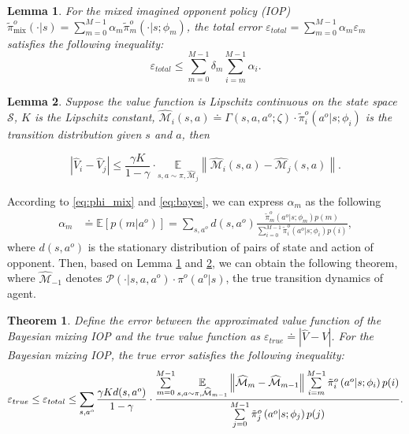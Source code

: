 \documentclass{article}
\newtheorem{theorem}{Theorem}
\newtheorem{lemma}{Lemma}
\begin{document}
\begin{lemma}
For the mixed imagined opponent policy (IOP) $\tilde{\pi}_{\operatorname{mix}}^o(\cdot|s) = \sum_{m=0}^{M-1}\alpha_m\tilde{\pi}^o_m(\cdot|s; \phi_m)$, the total error $\varepsilon_{total} = \sum_{m=0}^{M-1}\alpha_m\varepsilon_m$ satisfies the following inequality:
\begin{equation*}\label{eq:total-bound}
    \varepsilon_{total}\leq\sum_{m=0}^{M-1}\delta_m\sum_{i=m}^{M-1}\alpha_i.
\end{equation*}
\label{lem:total-error}
\end{lemma}


\begin{lemma}
Suppose the value function is Lipschitz continuous on the state space $\mathcal{S}$, $K$ is the Lipschitz constant, $\widehat{\mathcal{M}}_i(s,a) \doteq \Gamma(s,a,a^o;\zeta) \cdot \tilde{\pi}^o_i(a^o|s;\phi_i)$ is the transition distribution given $s$ and $a$, then

\begin{equation*}
\left|\widehat{V}_i-\widehat{V}_{j}\right| \leq\frac{\gamma K}{1-\gamma} \cdot\underset{s,a\sim \pi,\widehat{\mathcal{M}}_j}{\mathbb{E}}\left\|\widehat{\mathcal{M}}_i(s, a)-\widehat{\mathcal{M}}_j(s, a)\right\|.
\end{equation*}
\label{lem:obj-bound}
\end{lemma}
According to \eqref{eq:phi_mix} and \eqref{eq:bayes}, we can express $\alpha_m$ as the following
\begin{align*}
    \alpha_m & \doteq \mathbb{E}\left[p(m | a^o)\right] = \sum\limits_{s,a^o} d(s,a^o) \frac{\tilde{\pi}^o_m\left(a^{o} | s ; \phi_{m}\right)p(m)}{\sum_{i=0}^{M-1}\tilde{\pi}^o_i\left(a^{o} | s ; \phi_{i}\right) p(i)},
\end{align*}
where $d(s,a^o)$ is the stationary distribution of pairs of state and action of opponent. Then,
based on Lemma \ref{lem:total-error} and \ref{lem:obj-bound}, we can obtain the following theorem, where $\widehat{\mathcal{M}}_{-1}$ denotes $\mathcal{P}(\cdot|s,a,a^o) \cdot \pi^o(a^o|s)$, the true transition dynamics of agent. 

\begin{theorem}\label{the:error-bound}
Define the error between the approximated value function of the Bayesian mixing IOP and the true value function as $\varepsilon_{true}\doteq \left|\widehat{V}-V\right|$. For the Bayesian mixing IOP, the true error satisfies the following inequality:
\begin{equation*}\small
\label{eq:full-total-bound}
\varepsilon_{true} \leq \varepsilon_{total} \leq \sum\limits_{s,a^o}\frac{\gamma K d(s,a^o)}{1-\gamma} 
  \cdot \frac{\sum\limits_{m=0}^{M-1}\underset{s,a\sim\pi,\widehat{\mathcal{M}}_{m-1}}{\mathbb{E}}\left\|\widehat{\mathcal{M}}_m-\widehat{\mathcal{M}}_{m-1}\right\|\sum\limits_{i=m}^{M-1}\tilde{\pi}^o_i\left(a^{o} | s ; \phi_{i}\right) p(i)}{\sum\limits_{j=0}^{M-1}\tilde{\pi}^o_j\left(a^{o} | s ; \phi_{j}\right) p(j)}.
\end{equation*}
\end{theorem}
\end{document}
